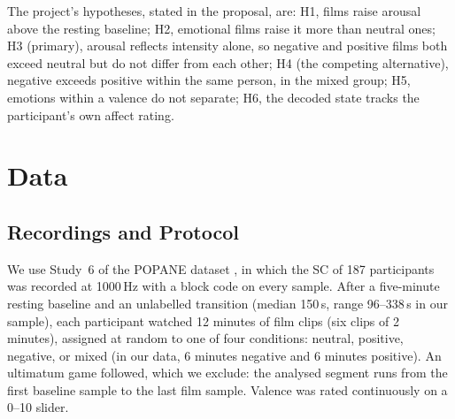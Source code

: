 \documentclass[conference]{IEEEtran}
\begin{document}
The project's hypotheses, stated in the proposal, are: H1, films raise arousal above the resting
baseline; H2, emotional films raise it more than neutral ones; H3 (primary), arousal reflects
intensity alone, so negative and positive films both exceed neutral but do not differ from each
other; H4 (the competing alternative), negative exceeds positive within the same person, in the
mixed group; H5, emotions within a valence do not separate; H6, the decoded state tracks the
participant's own affect rating.

\section{Data}

\subsection{Recordings and Protocol}
We use Study~6 of the POPANE dataset \cite{behnke2022}, in which the SC of 187 participants was
recorded at 1000\,Hz with a block code on every sample. After a five-minute resting baseline and
an unlabelled transition (median 150\,s, range 96--338\,s in our sample), each participant
watched 12 minutes of film clips (six clips of 2 minutes), assigned at random to one of four
conditions: neutral, positive, negative, or mixed (in our data, 6 minutes negative and 6 minutes
positive). An ultimatum game followed, which we exclude: the analysed segment runs from the first
baseline sample to the last film sample. Valence was rated continuously on a 0--10 slider.
\end{document}
